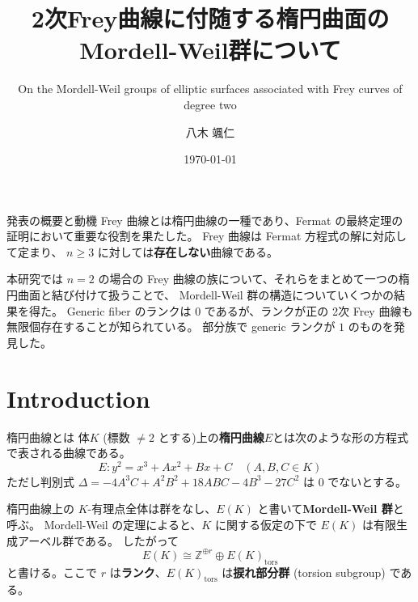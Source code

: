 \documentclass{classes/mybeamer}
\title{2次Frey曲線に付随する楕円曲面のMordell-Weil群について}
\subtitle{On the Mordell-Weil groups of elliptic surfaces associated with Frey curves of degree two}
\author{八木 颯仁}
\institute{慶應義塾大学 栗原研究室 修士2年}
\date{\today}
\begin{document}
\begin{frame}
    \titlepage
\end{frame}

\begin{frame}{発表の概要と動機}
    Frey 曲線とは楕円曲線の一種であり、Fermat の最終定理の証明において重要な役割を果たした。
    Frey 曲線は Fermat 方程式の解に対応して定まり、 $n\geq 3$ に対しては\textbf{存在しない}曲線である。
    
    本研究では $n=2$ の場合の Frey 曲線の族について、それらをまとめて一つの楕円曲面と結び付けて扱うことで、 Mordell-Weil 群の構造についていくつかの結果を得た。
    Generic fiber のランクは $0$ であるが、ランクが正の 2次 Frey 曲線も無限個存在することが知られている。
    部分族で generic ランクが $1$ のものを発見した。

    \vspace{1cm}
    \tableofcontents
\end{frame}

\section{Introduction}
\begin{frame}{楕円曲線とは}
    体$K$ (標数 $\neq2$ とする)上の\color{blue}\textbf{楕円曲線}\color{black}$E$とは次のような形の方程式で表される曲線である。
    \begin{equation*}
        E: y^{2} = x^{3} + Ax^2 + Bx + C \quad (A,B,C \in K)
    \end{equation*}
    ただし判別式 $\Delta = -4A^3C + A^2B^2 + 18ABC - 4B^3 - 27C^2$ は $0$ でないとする。

    \vspace{1cm}

    楕円曲線上の $K$-有理点全体は群をなし、$E(K)$ と書いて\color{blue}\textbf{Mordell-Weil 群}\color{black}と呼ぶ。
    Mordell-Weil の定理によると、$K$ に関する仮定の下で $E(K)$ は有限生成アーベル群である。
    したがって
    \begin{equation*}
        E(K) \cong \mathbb{Z}^{\oplus r} \oplus E(K)_{\mathrm{tors}}
    \end{equation*}
    と書ける。ここで $r$ は\color{blue}\textbf{ランク}\color{black}、$E(K)_{\mathrm{tors}}$ は\color{blue}\textbf{捩れ部分群}\color{black} (torsion subgroup) である。
\end{frame}

\end{document}
